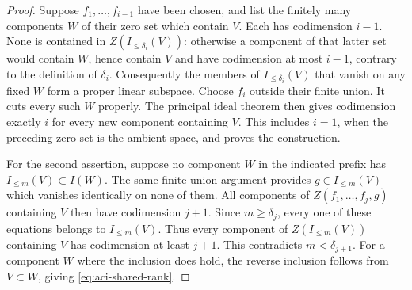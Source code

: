 \begin{proof}
Suppose $f_1,\ldots,f_{i-1}$ have been chosen, and list the finitely many components $W$ of their zero set which contain $V$.  Each has codimension $i-1$.  None is contained in $Z(I_{\le\delta_i}(V))$: otherwise a component of that latter set would contain $W$, hence contain $V$ and have codimension at most $i-1$, contrary to the definition of $\delta_i$.  Consequently the members of $I_{\le\delta_i}(V)$ that vanish on any fixed $W$ form a proper linear subspace.  Choose $f_i$ outside their finite union.  It cuts every such $W$ properly.  The principal ideal theorem then gives codimension exactly $i$ for every new component containing $V$. This includes $i=1$, when the preceding zero set is the ambient space, and proves the construction.

For the second assertion, suppose no component $W$ in the indicated prefix has $I_{\le m}(V)\subset I(W)$.  The same finite-union argument provides $g\in I_{\le m}(V)$ which vanishes identically on none of them.  All components of $Z(f_1,\ldots,f_j,g)$ containing $V$ then have codimension $j+1$.  Since $m\ge\delta_j$, every one of these equations belongs to $I_{\le m}(V)$.  Thus every component of $Z(I_{\le m}(V))$ containing $V$ has codimension at least $j+1$. This contradicts $m<\delta_{j+1}$.  For a component $W$ where the inclusion does hold, the reverse inclusion follows from $V\subset W$, giving \eqref{eq:aci-shared-rank}.
\end{proof}

